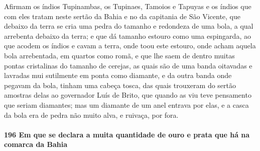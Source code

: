 Afirmam os índios Tupinambas, os Tupinaes, Tamoios e Tapuyas e os índios que com eles
tratam neste sertão da Bahia e no da capitania de São Vicente, que debaixo da terra se
cria uma pedra do tamanho e redondeza de uma bola, a qual arrebenta debaixo da terra; e
que dá tamanho estouro como uma espingarda, ao que acodem os índios e cavam a terra, onde
toou este estouro, onde acham aquela bola arrebentada, em quartos como romã, e que lhe
saem de dentro muitas pontas cristalinas do tamanho de cerejas, as quais são de uma banda
oitavadas e lavradas mui sutilmente em ponta como diamante, e da outra banda onde pegavam
da bola, tinham uma cabeça tosca, das quais trouxeram do sertão amostras delas ao
governador Luís de Brito, que quando as viu teve pensamento que seriam diamantes; mas um
diamante de um anel entrava por elas, e a casca da bola era de pedra não muito alva, e
ruivaça, por fora.

\paragraph{196 Em que se declara a muita quantidade de ouro e prata que há na comarca da
Bahia}

